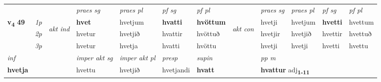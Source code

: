 \begin{longtable}[l]{X>{\footnotesize\itshape}llXXXXlXXXX}
 & &   & \textit{praes sg}  & \textit{praes pl}    & \textit{ pf sg} & \textit{pf pl} & & \textit{praes sg}  & \textit{praes pl}    & \textit{pf sg} & \textit{pf pl }  \\ \cmidrule{4-7} \cmidrule{9-12}
 \multirow{2}{*}{{{\textbf{v{\textsubscript{4}}} \Large{\textbf{49}}}}}  & 1p & \multirow{3}{*}{\begin{turn}{90}\textit{akt ind}\end{turn}} & \textbf{hvet} & hvetjum & \textbf{hvatti} & \textbf{hvöttum} & \multirow{3}{*}{\begin{turn}{90}\textit{akt con}\end{turn}} &hvetji & hvetjum & \textbf{hvetti} & hvettum\\*
 & 2p &  &  hvetur  & hvetjið & hvattir & hvöttuð & & hvetjir & hvetjið & hvettir & hvettuð \\*
 & 3p &  & hvetur & hvetja & hvatti & hvöttu & & hvetji & hvetji& hvetti & hvettu \\*
\cmidrule{4-7} \cmidrule{9-12}

   {\textit{inf}} & &  & \textit{imper akt sg} & \textit{imper akt pl}   & \textit{presp} & \textit{supin}  && \textit{pp m} \\*
  {\textbf{hvetja}} & && hvettu  & hvetjið   & hvetjandi &  \textbf{hvatt}  && \multicolumn{2}{l}{\textbf{hvattur} adj\textbf{\textsubscript{1-11}}} \\*

\midrule


\end{longtable}
